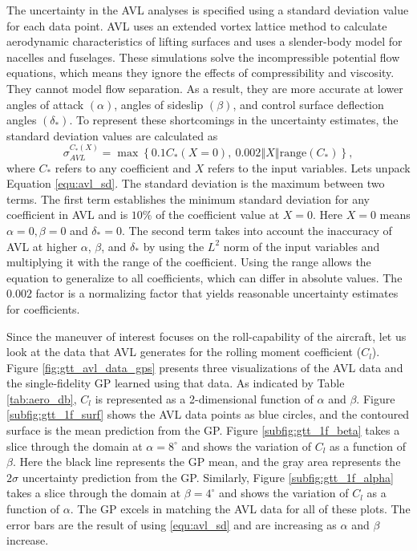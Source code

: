 The uncertainty in the AVL analyses is specified using a standard deviation value for each data point. 
AVL uses an extended vortex lattice method to calculate aerodynamic characteristics of lifting surfaces and uses a slender-body model for nacelles and fuselages. 
These simulations solve the incompressible potential flow equations, which means they ignore the effects of compressibility and viscosity. 
They cannot model flow separation.
As a result, they are more accurate at lower angles of attack $(\alpha)$, angles of sideslip $(\beta)$, and control surface deflection angles $(\delta_*)$.
To represent these shortcomings in the uncertainty estimates, the standard deviation values are calculated as
\begin{equation}\label{equ:avl_sd}
    \sigma_{AVL}^{C_*(X)} = \max \left \{ 0.1C_*(X=0),~0.002 \left \Vert X \right \Vert \mathrm{range}(C_*) \right \},
\end{equation}
where $C_*$ refers to any coefficient and $X$ refers to the input variables.
Lets unpack Equation \ref{equ:avl_sd}.
The standard deviation is the maximum between two terms.
The first term establishes the minimum standard deviation for any coefficient in AVL and is $10\%$ of the coefficient value at $X =0$. 
Here $X=0$ means $\alpha=0, \beta=0$ and $\delta_* = 0$.
The second term takes into account the inaccuracy of AVL at higher $\alpha$, $\beta$, and $\delta_*$ by using the $L^2$ norm of the input variables and multiplying it with the range of the coefficient.
Using the range allows the equation to generalize to all coefficients, which can differ in absolute values.
The $0.002$ factor is a normalizing factor that yields reasonable uncertainty estimates for coefficients.

Since the maneuver of interest focuses on the roll-capability of the aircraft, let us look at the data that AVL generates for the rolling moment coefficient ($C_l$).
Figure \ref{fig:gtt_avl_data_gps} presents three visualizations of the AVL data and the single-fidelity GP learned using that data. 
As indicated by Table \ref{tab:aero_db}, $C_l$ is represented as a 2-dimensional function of $\alpha$ and $\beta$. 
Figure \ref{subfig:gtt_1f_surf} shows the AVL data points as blue circles, and the contoured surface is the mean prediction from the GP. 
Figure \ref{subfig:gtt_1f_beta} takes a slice through the domain at $\alpha = 8^\circ$ and shows the variation of $C_l$ as a function of $\beta$. 
Here the black line represents the GP mean, and the gray area represents the $2\sigma$ uncertainty prediction from the GP.
Similarly, Figure \ref{subfig:gtt_1f_alpha} takes a slice through the domain at $\beta = 4^\circ$ and shows the variation of $C_l$ as a function of $\alpha$. 
The GP excels in matching the AVL data for all of these plots. 
The error bars are the result of using \ref{equ:avl_sd} and are increasing as $\alpha$ and $\beta$ increase.

